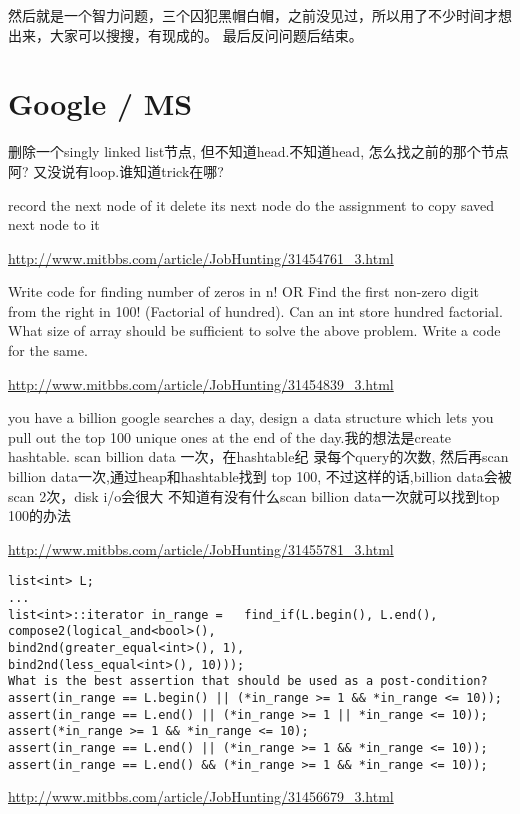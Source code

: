 \documentclass[12pt]{book}
\begin{document}
然后就是一个智力问题，三个囚犯黑帽白帽，之前没见过，所以用了不少时间才想出来，大家可以搜搜，有现成的。 最后反问问题后结束。

\chapter{Google / MS}
\label{sec-21}

删除一个singly linked list节点, 但不知道head.不知道head, 怎么找之前的那个节点阿? 又没说有loop.谁知道trick在哪?

record the next node of it delete its next node do the assignment to copy saved next node to it 

\url{http://www.mitbbs.com/article/JobHunting/31454761_3.html}

Write code for finding number of zeros in n! OR Find the first
non-zero digit from the right in 100! (Factorial of hundred). Can an
int store hundred factorial. What size of array should be sufficient to solve the above problem. Write a code for the same.

\url{http://www.mitbbs.com/article/JobHunting/31454839_3.html}

you have a billion google searches a day, design a data structure
which lets you pull out the top 100 unique ones at the end of the
day.我的想法是create hashtable. scan billion data 一次，在hashtable纪
录每个query的次数, 然后再scan billion data一次,通过heap和hashtable找到
top 100, 不过这样的话,billion data会被scan 2次，disk i/o会很大
不知道有没有什么scan billion data一次就可以找到top 100的办法

\url{http://www.mitbbs.com/article/JobHunting/31455781_3.html}

\lstset{language=java,label= ,caption= ,numbers=none}
\begin{lstlisting}
list<int> L;
...
list<int>::iterator in_range =   find_if(L.begin(), L.end(),          compose2(logical_and<bool>(),                   bind2nd(greater_equal<int>(), 1),                   bind2nd(less_equal<int>(), 10)));
What is the best assertion that should be used as a post-condition?
assert(in_range == L.begin() || (*in_range >= 1 && *in_range <= 10));
assert(in_range == L.end() || (*in_range >= 1 || *in_range <= 10));
assert(*in_range >= 1 && *in_range <= 10);
assert(in_range == L.end() || (*in_range >= 1 && *in_range <= 10));
assert(in_range == L.end() && (*in_range >= 1 && *in_range <= 10));
\end{lstlisting}

\url{http://www.mitbbs.com/article/JobHunting/31456679_3.html}
\end{document}
